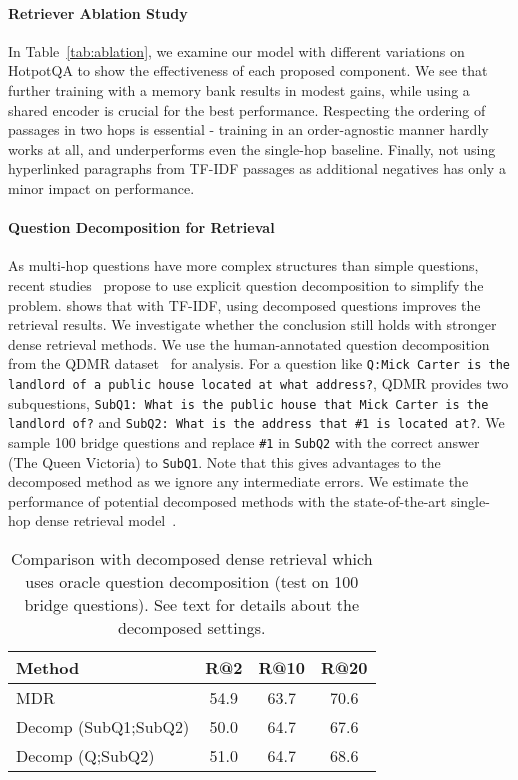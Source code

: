 \documentclass{article} \usepackage{iclr2021_conference,times}
\newcommand{\method}{MDR\xspace}
\begin{document}
\paragraph{Retriever Ablation Study} \label{sec:ablation}
In Table~\ref{tab:ablation}, we examine our model with different variations on HotpotQA to show the effectiveness of each proposed component. We see that further training with a memory bank results in modest gains, while using a shared encoder is crucial for the best performance. Respecting the ordering of passages in two hops is essential - training in an order-agnostic manner hardly works at all, and underperforms even the single-hop baseline. Finally, not using hyperlinked paragraphs from TF-IDF passages as additional negatives has only a minor impact on performance.


\paragraph{Question Decomposition for Retrieval}
\label{sec:decomposition}
As multi-hop questions have more complex structures than simple questions, recent studies~\citep{DecomQA,UQD} propose to use explicit question decomposition to simplify the problem. 
\citet{Break} shows that with TF-IDF, using decomposed questions improves the retrieval results. 
We investigate whether the conclusion still holds with stronger dense retrieval methods. 
We use the human-annotated question decomposition from the QDMR dataset~\citep{Break} for analysis. For a question like \texttt{Q:Mick Carter is the landlord of a public house located at what address?}, QDMR provides two subquestions, \texttt{SubQ1: What is the public house that Mick Carter is the landlord of?} and \texttt{SubQ2: What is the address that \#1 is located at?}.
We sample 100 bridge questions and replace \texttt{\#1} in \texttt{SubQ2} with the correct answer (The Queen Victoria) to \texttt{SubQ1}. 
Note that this gives advantages to the decomposed method as we ignore any intermediate errors. 
We estimate the performance of potential decomposed methods with the state-of-the-art single-hop dense retrieval model~\citep{DPR}.


\begin{wraptable}{r}{7.5cm}
    \centering
    \small
    \vspace{-0.1in}
    \caption{Comparison with decomposed dense retrieval which uses oracle question decomposition (test on 100 bridge questions). See text for details about the decomposed settings.}
    \begin{tabular}{lccc}
    \toprule
      Method & R@2 & R@10 & R@20 \\
    \midrule
     \method & 54.9 & 63.7 & 70.6\\
     Decomp (SubQ1;SubQ2) & 50.0 & 64.7 & 67.6 \\
     Decomp (Q;SubQ2) & 51.0 & 64.7 & 68.6 \\
    \bottomrule
    \end{tabular}
\label{tab:decomposition}
\end{wraptable}
 
\end{document}
